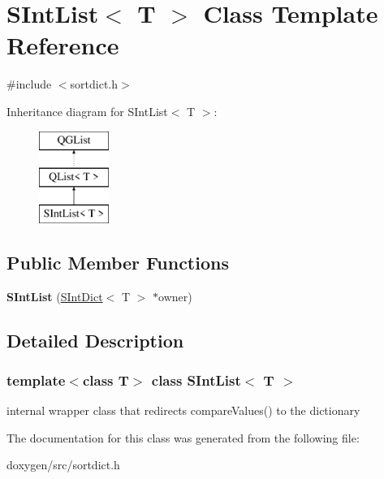 \hypertarget{class_s_int_list}{}\section{S\+Int\+List$<$ T $>$ Class Template Reference}
\label{class_s_int_list}


{\ttfamily \#include $<$sortdict.\+h$>$}

Inheritance diagram for S\+Int\+List$<$ T $>$\+:\begin{figure}[H]
\begin{center}
\leavevmode
\includegraphics[height=3.000000cm]{class_s_int_list}
\end{center}
\end{figure}
\subsection*{Public Member Functions}
\begin{DoxyCompactItemize}
\item 
\mbox{\label{class_s_int_list_afca4889e8c536be9025e40bb7897f234}} 
{\bfseries S\+Int\+List} (\mbox{\hyperlink{class_s_int_dict}{S\+Int\+Dict}}$<$ T $>$ $\ast$owner)
\end{DoxyCompactItemize}


\subsection{Detailed Description}
\subsubsection*{template$<$class T$>$\newline
class S\+Int\+List$<$ T $>$}

internal wrapper class that redirects compare\+Values() to the dictionary 

The documentation for this class was generated from the following file\+:\begin{DoxyCompactItemize}
\item 
doxygen/src/sortdict.\+h\end{DoxyCompactItemize}
